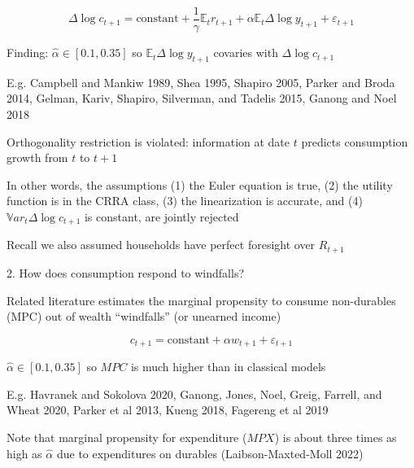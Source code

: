 \documentclass[11pt, aspectratio=169]{beamer}
\newenvironment{witemize}{\itemize\addtolength{\itemsep}{10pt}}{\enditemize}
\begin{document}
\begin{frame}{}

\begin{equation*}
	\Delta \log c_{t+1} = \text{constant} + \frac{1}{\gamma} \mathbb E_t r_{t+1} + \alpha \mathbb E_t \Delta \log y_{t+1} + \varepsilon_{t+1} 
\end{equation*}

\vspace{2mm}
\begin{witemize}
\item Finding: $\hat \alpha \in [0.1, 0.35]$ so $\mathbb E_t \Delta \log y_{t+1}$ covaries with $\Delta \log c_{t+1}$ 

	\vspace{2mm}
	{\footnotesize E.g. Campbell and Mankiw 1989, Shea 1995, Shapiro 2005, Parker and Broda 2014, Gelman, Kariv, Shapiro, Silverman, and Tadelis 2015, Ganong and Noel 2018}

\item Orthogonality restriction is violated: information at date $t$ predicts consumption growth from $t$ to $t+1$

\item In other words, the assumptions (1) the Euler equation is true, (2) the utility function is in the CRRA class, (3) the linearization is accurate, and (4) $\mathbb Var_t \Delta \log c_{t+1}$ is constant, are jointly rejected

	\vspace{1mm}
	{\footnotesize Recall we also assumed households have perfect foresight over $R_{t+1}$}

\end{witemize}
\end{frame}


\begin{frame}{2. How does consumption respond to windfalls?}

\begin{witemize}
\item Related literature estimates the marginal propensity to consume non-durables
(MPC) out of wealth ``windfalls'' (or unearned income)

\begin{equation*}
	c_{t+1} = \text{constant} + \alpha w_{t+1} + \varepsilon_{t+1}
\end{equation*}

\item $\hat \alpha \in [0.1, 0.35]$ so $MPC$ is much higher than in classical models 

	\vspace{2mm}
	{\footnotesize E.g. Havranek and Sokolova 2020, Ganong, Jones, Noel, Greig, Farrell, and Wheat 2020, Parker et al 2013, Kueng 2018, Fagereng et al 2019}

\item Note that marginal propensity for expenditure ($MPX$) is about three times as high as $\hat \alpha$ due to expenditures on durables (Laibson-Maxted-Moll 2022)

\end{witemize}
\end{frame}
\end{document}
